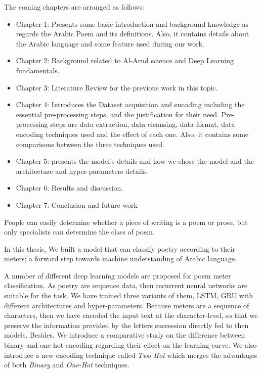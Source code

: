 


\begin{spacing}{1}\end{spacing}
The coming chapters are arranged as follows:
\begin{itemize}
\item Chapter 1: Presents some basic introduction and background knowledge as regards the Arabic Poem and its definitions. Also, it contains details about the Arabic language and some feature used during our work.
  \item Chapter 2: Background related to Al-Arud science and Deep Learning fundamentals. 
  \item Chapter 3: Literature Review for the previous work in this topic.    
  \item Chapter 4: Introduces the Dataset acquisition and encoding including the essential pre-processing steps, and the justification for their need. Pre-processing steps are data extraction, data cleansing, data format, data encoding techniques used and the effect of each one. Also, it contains some comparisons between the three techniques used.
  \item Chapter 5: presents the model's details and how we chose the model and the architecture and hyper-parameters details.
  \item Chapter 6: Results and discussion.
  \item Chapter 7: Conclusion and future work
\end{itemize}


 




\begin{spacing}{1}\end{spacing}


People can easily determine whether a piece of writing is a poem or prose, but only specialists can determine the class of poem.

In this thesis, We built a model that can classify poetry according to their meters; a forward step towards machine understanding of Arabic language.

A number of different deep learning models are proposed for poem meter classification. As poetry are sequence data, then recurrent neural networks are suitable for the task. We have trained three variants of them, LSTM, GRU with different architectures and hyper-parameters. Because meters are a sequence of characters, then we have encoded the input text at the character-level, so that we preserve the information provided by the letters succession directly fed to then models. Besides, We introduce a comparative study on the difference between binary and one-hot encoding regarding their effect on the learning curve. We also introduce a new encoding technique called \textit{Two-Hot} which merges the advantages of both \textit{Binary} and \textit{One-Hot} techniques.


